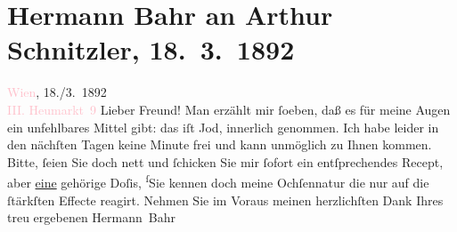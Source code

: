 

               \section[Hermann Bahr an Arthur Schnitzler, 18. 3. 1892]{ Hermann Bahr an Arthur Schnitzler, 18. 3. 1892}\nopagebreak{}\rehead{ }\normalsize\beginnumbering{} \toendnotes[C]{\smallbreak\pagebreak[2]} 
\pstart
           \raggedleft{}{\pb}\textcolor{pink}{Wien}{}\ledrightnote{\textcolor{pink}{Wien}}, 18./3. 1892{\\}\textcolor{pink}{III. Heumarkt 9}{}\ledrightnote{\textcolor{pink}{Am Heumarkt}}\pend
           \pstart{}Lieber Freund!\pend\pstart
           Man erzählt mir ſoeben, daß es für meine Augen ein unfehlbares Mittel gibt: das iſt
               Jod, innerlich genommen. Ich habe leider in den nächſten Tagen keine Minute frei und
               kann unmöglich zu Ihnen kommen. Bitte, ſeien Sie doch nett und ſchicken Sie mir
               ſofort ein entſprechendes Recept, aber \uline{eine}{ }{\pb}gehörige Doſis, \substVorne{}\textsuperscript{ſ}\substDazwischen{}S\substHinten{}ie kennen doch meine \label{LL153-1v}Ochſennatur\label{LL153-1h} die nur auf die ſtärkſten Effecte reagirt. Nehmen Sie im
               Voraus meinen herzlichſten Dank Ihres treu ergebenen\pend
           \pstart \spacefill\mbox{Hermann Bahr}\pend{}\endnumbering{}  
      